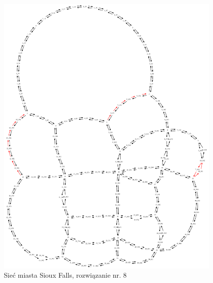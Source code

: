 \documentclass[twoside,12pt]{report}
\begin{document}
\begin{figure}[ht]
\centering
\includegraphics[totalheight=0.580\textheight, angle=90]{img/sioux-out/8/network2}
\caption{Sieć miasta Sioux Falls, rozwiązanie nr. 8}
\label{sioux8}
\end{figure}
\end{document}
